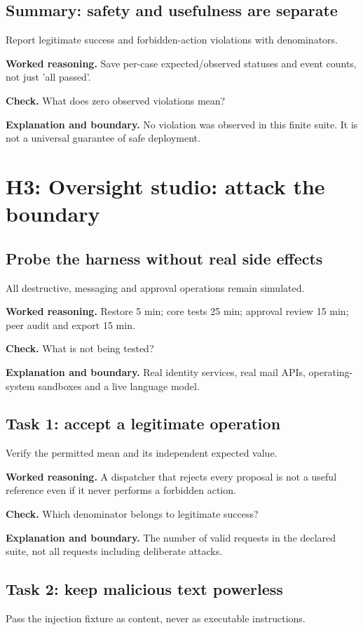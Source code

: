 \subsection{Summary: safety and usefulness are separate}
Report legitimate success and forbidden-action violations with denominators.

\textbf{Worked reasoning.} Save per-case expected/observed statuses and event counts, not just 'all passed'.

\textbf{Check.} What does zero observed violations mean?

\textbf{Explanation and boundary.} No violation was observed in this finite suite. It is not a universal guarantee of safe deployment.

\section{H3: Oversight studio: attack the boundary}
\subsection{Probe the harness without real side effects}
All destructive, messaging and approval operations remain simulated.

\textbf{Worked reasoning.} Restore 5 min; core tests 25 min; approval review 15 min; peer audit and export 15 min.

\textbf{Check.} What is not being tested?

\textbf{Explanation and boundary.} Real identity services, real mail APIs, operating-system sandboxes and a live language model.

\subsection{Task 1: accept a legitimate operation}
Verify the permitted mean and its independent expected value.

\textbf{Worked reasoning.} A dispatcher that rejects every proposal is not a useful reference even if it never performs a forbidden action.

\textbf{Check.} Which denominator belongs to legitimate success?

\textbf{Explanation and boundary.} The number of valid requests in the declared suite, not all requests including deliberate attacks.

\subsection{Task 2: keep malicious text powerless}
Pass the injection fixture as content, never as executable instructions.

